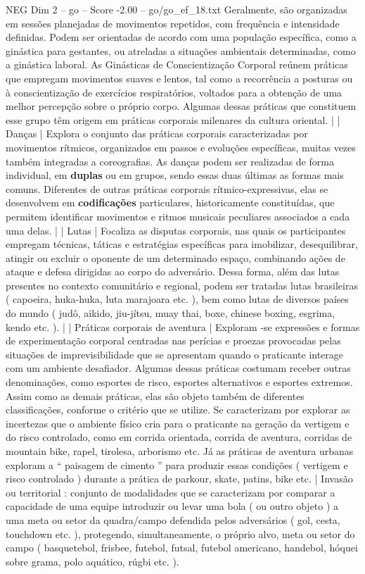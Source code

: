 \begin{textsample}{NEG Dim 2 – go – Score -2.00 – go/go\_ef\_18.txt}
Geralmente, são organizadas em sessões planejadas de movimentos repetidos, com frequência e intensidade definidas.
Podem ser orientadas de acordo com uma população específica, como a ginástica para gestantes, ou atreladas a situações ambientais determinadas, como a ginástica laboral.
As Ginásticas de Conscientização Corporal reúnem práticas que empregam movimentos suaves e lentos, tal como a recorrência a posturas ou à conscientização de exercícios respiratórios, voltados para a obtenção de uma melhor percepção sobre o próprio corpo.
Algumas dessas práticas que constituem esse grupo têm origem em práticas corporais milenares da cultura oriental. | | Danças | Explora o conjunto das práticas corporais caracterizadas por movimentos rítmicos, organizados em passos e evoluções específicas, muitas vezes também integradas a coreografias.
As danças podem ser realizadas de forma individual, em \textbf{duplas} ou em grupos, sendo essas duas últimas as formas mais comuns.
Diferentes de outras práticas corporais rítmico-expressivas, elas se desenvolvem em \textbf{codificações} particulares, historicamente constituídas, que permitem identificar movimentos e ritmos musicais peculiares associados a cada uma delas. | | Lutas | Focaliza as disputas corporais, nas quais os participantes empregam técnicas, táticas e estratégias específicas para imobilizar, desequilibrar, atingir ou excluir o oponente de um determinado espaço, combinando ações de ataque e defesa dirigidas ao corpo do adversário.
Dessa forma, além das lutas presentes no contexto comunitário e regional, podem ser tratadas lutas brasileiras ( capoeira, huka-huka, luta marajoara etc. ), bem como lutas de diversos países do mundo ( judô, aikido, jiu-jítsu, muay thai, boxe, chinese boxing, esgrima, kendo etc. ). | | Práticas corporais de aventura | Exploram -se expressões e formas de experimentação corporal centradas nas perícias e proezas provocadas pelas situações de imprevisibilidade que se apresentam quando o praticante interage com um ambiente desafiador.
Algumas dessas práticas costumam receber outras denominações, como esportes de risco, esportes alternativos e esportes extremos.
Assim como as demais práticas, elas são objeto também de diferentes classificações, conforme o critério que se utilize.
Se caracterizam por explorar as incertezas que o ambiente físico cria para o praticante na geração da vertigem e do risco controlado, como em corrida orientada, corrida de aventura, corridas de mountain bike, rapel, tirolesa, arborismo etc.
Já as práticas de aventura urbanas exploram a “ paisagem de cimento ” para produzir essas condições ( vertigem e risco controlado ) durante a prática de parkour, skate, patins, bike etc. | Invasão ou territorial : conjunto de modalidades que se caracterizam por comparar a capacidade de uma equipe introduzir ou levar uma bola ( ou outro objeto ) a uma meta ou setor da quadra/campo defendida pelos adversários ( gol, cesta, touchdown etc. ), protegendo, simultaneamente, o próprio alvo, meta ou setor do campo ( basquetebol, frisbee, futebol, futsal, futebol americano, handebol, hóquei sobre grama, polo aquático, rúgbi etc. ).

\end{textsample}
